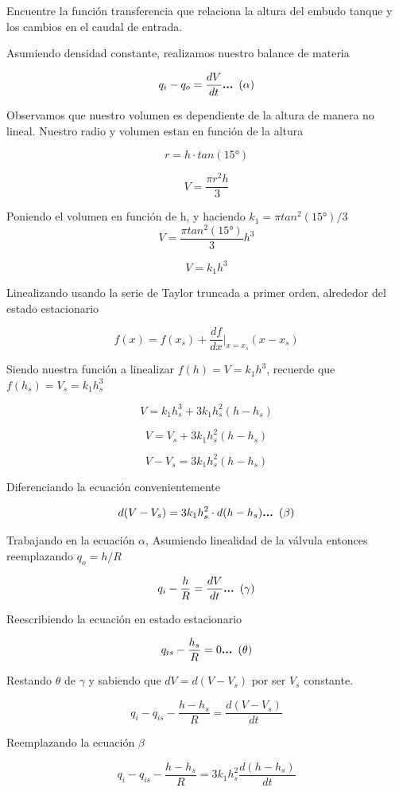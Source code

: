 \documentclass[
  letterpaper,
  DIV=11,
  numbers=noendperiod]{scrreprt}
\begin{document}
Encuentre la función transferencia que relaciona la altura del embudo
tanque y los cambios en el caudal de entrada.

Asumiendo densidad constante, realizamos nuestro balance de materia

\[
q_i-q_o=\frac{dV}{dt}\space\space\space\space\textbf{... }\mathbf{(\alpha)}
\]

Observamos que nuestro volumen es dependiente de la altura de manera no
lineal. Nuestro radio y volumen estan en función de la altura

\[
r = h\cdot tan(15°)
\]

\[
V = \frac{\pi r^2 h}{3}
\]

Poniendo el volumen en función de h, y haciendo \(k_1=\pi tan^2(15°)/3\)
\[
V = \frac{\pi tan^2(15°)}{3}h^3
\]

\[
V = k_1h^3
\]

Linealizando usando la serie de Taylor truncada a primer orden,
alrededor del estado estacionario

\[
f(x)=f(x_s)+\frac{df}{dx}\bigg |_{x=x_s} (x-x_s)
\]

Siendo nuestra función a linealizar \(f(h)=V=k_1h^3\), recuerde que
\(f(h_s)=V_s=k_1h_s^3\)

\[
V=k_1h_s^3+3k_1h_s^2(h-h_s)
\]

\[
V=V_s+3k_1h_s^2(h-h_s)
\]

\[
V-V_s=3k_1h_s^2(h-h_s)
\]

Diferenciando la ecuación convenientemente

\[
d(V-V_s)=3k_1h_s^2\cdot d(h-h_s)\space\space\space\space\textbf{... }\mathbf{(\beta)}
\]

Trabajando en la ecuación \(\alpha\), Asumiendo linealidad de la válvula
entonces reemplazando \(q_o=h/R\)

\[
q_i-\frac{h}{R}=\frac{dV}{dt}\space\space\space\space\textbf{... }\mathbf{(\gamma)}
\]

Reescribiendo la ecuación en estado estacionario

\[
q_{is}-\frac{h_s}{R}=0\space\space\space\space\textbf{... }\mathbf{(\theta)}
\]

Restando \(\theta\) de \(\gamma\) y sabiendo que \(dV=d(V-V_s)\) por ser
\(V_s\) constante.

\[
q_i-q_{is}-\frac{h-h_s}{R}=\frac{d(V-V_s)}{dt}
\]

Reemplazando la ecuación \(\beta\)

\[
q_i-q_{is}-\frac{h-h_s}{R}=3k_1h_s^2\frac{d(h-h_s)}{dt}
\]
\end{document}

